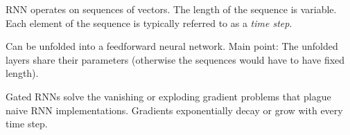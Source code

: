 



RNN operates on sequences of vectors. The length of the sequence is
variable. Each element of the sequence is typically referred to as a \emph{time
  step}.

Can be unfolded into a feedforward neural network. Main point: The unfolded
layers share their parameters (otherwise the sequences would have to have fixed
length).


Gated RNNs solve the vanishing or exploding gradient problems that plague naive
RNN implementations. Gradients exponentially decay or grow with every time step.



